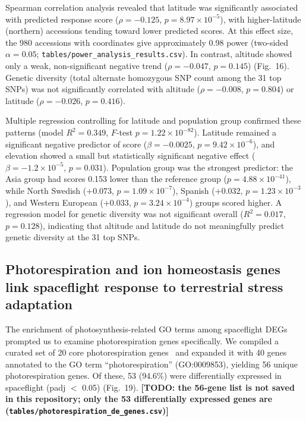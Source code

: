 \documentclass[sn-mathphys-num,Basic]{sn-jnl}
\begin{document}
Spearman correlation analysis revealed that latitude was significantly associated with predicted response score ($\rho = -0.125$, $p = 8.97 \times 10^{-5}$), with higher-latitude (northern) accessions tending toward lower predicted scores. At this effect size, the 980 accessions with coordinates give approximately 0.98 power (two-sided $\alpha = 0.05$; \texttt{tables/power\_analysis\_results.csv}). In contrast, altitude showed only a weak, non-significant negative trend ($\rho = -0.047$, $p = 0.145$) (Fig.~16). Genetic diversity (total alternate homozygous SNP count among the 31 top SNPs) was not significantly correlated with altitude ($\rho = -0.008$, $p = 0.804$) or latitude ($\rho = -0.026$, $p = 0.416$).

Multiple regression controlling for latitude and population group confirmed these patterns (model $R^2 = 0.349$, $F$-test $p = 1.22 \times 10^{-82}$). Latitude remained a significant negative predictor of score ($\beta = -0.0025$, $p = 9.42 \times 10^{-6}$), and elevation showed a small but statistically significant negative effect ($\beta = -1.2 \times 10^{-5}$, $p = 0.031$). Population group was the strongest predictor: the Asia group had scores 0.153 lower than the reference group ($p = 4.88 \times 10^{-41}$), while North Swedish ($+0.073$, $p = 1.09 \times 10^{-7}$), Spanish ($+0.032$, $p = 1.23 \times 10^{-3}$), and Western European ($+0.033$, $p = 3.24 \times 10^{-4}$) groups scored higher. A regression model for genetic diversity was not significant overall ($R^2 = 0.017$, $p = 0.128$), indicating that altitude and latitude do not meaningfully predict genetic diversity at the 31 top SNPs.

\subsection{Photorespiration and ion homeostasis genes link spaceflight response to terrestrial stress adaptation}

The enrichment of photosynthesis-related GO terms among spaceflight DEGs prompted us to examine photorespiration genes specifically. We compiled a curated set of 20 core photorespiration genes~\cite{Bauwe2012} and expanded it with 40 genes annotated to the GO term ``photorespiration'' (GO:0009853), yielding 56 unique photorespiration genes. Of these, 53 (94.6\%) were differentially expressed in spaceflight (padj $<$ 0.05) (Fig.~19). \textbf{[TODO: the 56-gene list is not saved in this repository; only the 53 differentially expressed genes are (\texttt{tables/photorespiration\_de\_genes.csv})]}
\end{document}
